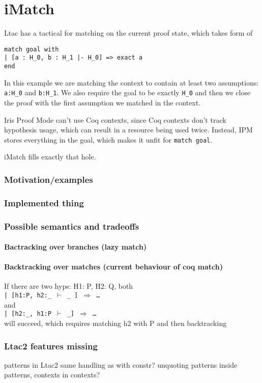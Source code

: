 \chapter{iMatch}

Ltac has a tactical for matching on the current proof state, which takes form of

\begin{lstlisting}[language=caml]
match goal with
| [a : H_0, b : H_1 |- H_0] => exact a
end
\end{lstlisting}

In this example we are matching the context to contain at least two assumptions: \verb|a:H_0| and \verb|b:H_1|.
We also require the goal to be exactly \verb|H_0| and then we close the proof with the first assumption we matched in the context.\

Iris Proof Mode can't use Coq contexts, since Coq contexts don't track hypothesis usage, which can result in a resource being used twice.
Instead, IPM stores everything in the goal, which makes it unfit for \verb|match goal|.

iMatch fills exactly that hole.

\subsection{Motivation/examples}




\subsection{Implemented thing}

\subsection{Possible semantics and tradeoffs}

\subsubsection{Bactracking over branches (lazy match)}

\subsubsection{Backtracking over matches (current behaviour of coq match)}


If there are two hyps: H1: P, H2: Q,
both\\
\texttt{| [h1:P, h2:\_ $\vdash$ \_ ] $\Rightarrow$ \ldots}\\
and\\
\texttt{| [h2:\_, h1:P $\vdash$ \_] $\Rightarrow$ \ldots}\\
will succeed, which requires matching h2 with P and then backtracking

\subsection{Ltac2 features missing}

patterns in Ltac2
same handling as with constr?
unquoting patterns inside patterns, contexts in contexts?
